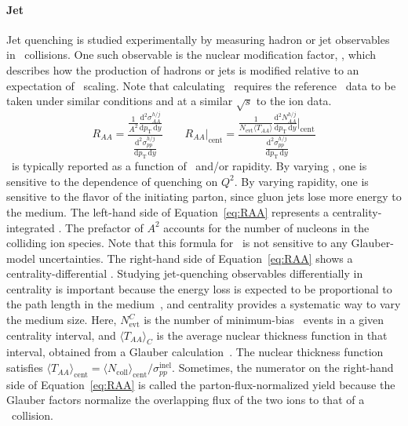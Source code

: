 \paragraph{Jet \texorpdfstring{\Raa}{Raa}} Jet quenching is studied experimentally by measuring hadron or jet observables in \AxA\ collisions.
One such observable is the nuclear modification factor, \Raa, which describes how the production of hadrons or jets is modified relative to an expectation of \NCOLL\ scaling.
Note that calculating \Raa\ requires the reference \pxp\ data to be taken under similar conditions and at a similar $\sqrt{s}$ to the ion data.
\begin{equation}
    \label{eq:RAA}
    R_{AA} =
    \frac{\displaystyle \frac{1}{A^2}
    \frac{\mathrm{d}^2\sigma_{AA}^{h/j}}{\mathrm{d}p_{\mathrm{T}}\,\mathrm{d}y}}
    {\displaystyle \frac{\mathrm{d}^2\sigma_{pp}^{h/j}}
    {\mathrm{d}p_{\mathrm{T}}\,\mathrm{d}y}}
    \quad \quad
    R_{AA}|_{\mathrm{cent}} =
    \frac{\displaystyle
        \frac{1}{N_{\mathrm{evt}}\langle T_{AA}\rangle}
        \frac{ \mathrm{d}^2N_{AA}^{h/j}}
    {\mathrm{d}p_{\mathrm{T}}\,\mathrm{d}y} \bigg |_{\mathrm{cent}}}
    {\displaystyle \frac{\mathrm{d}^2\sigma_{pp}^{h/j}}
    {\mathrm{d}p_{\mathrm{T}}\,\mathrm{d}y}}
\end{equation}
\Raa\ is typically reported as a function of \PT\ and/or rapidity.
By varying \PT, one is sensitive to the dependence of quenching on $Q^2$.
By varying rapidity, one is sensitive to the flavor of the initiating parton, since gluon jets lose more energy to the medium.
The left-hand side of Equation~\ref{eq:RAA} represents a centrality-integrated \Raa.
The prefactor of $A^2$ accounts for the number of nucleons in the colliding ion species.
Note that this formula for \Raa\ is not sensitive to any Glauber-model uncertainties.
The right-hand side of Equation~\ref{eq:RAA} shows a centrality-differential \Raa.
Studying jet-quenching observables differentially in centrality is important because the energy loss is expected to be proportional to the path length in the medium~\cite{QGP:JetQuenching}, and centrality provides a systematic way to vary the medium size.
Here, $N_{\mathrm{evt}}^C$ is the number of minimum-bias \AxA\ events in a given centrality interval, and $\langle T_{AA}\rangle_C$ is the average nuclear thickness function in that interval, obtained from a Glauber calculation~\cite{Glauber}.
The nuclear thickness function satisfies $\langle T_{AA}\rangle_{\mathrm{cent}}=\langle N_{\mathrm{coll}}\rangle_{\mathrm{cent}}/\sigma_{pp}^{\mathrm{inel}}$. Sometimes, the numerator on the right-hand side of Equation~\ref{eq:RAA} is called the parton-flux-normalized yield because the Glauber factors normalize the overlapping flux of the two ions to that of a \pxp\ collision.

